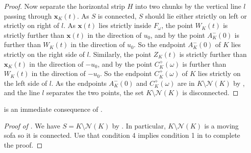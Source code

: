 \begin{proof}
Now separate the horizontal strip \(H\) into two chunks by the vertical line \(l\) passing through \(\mathbf{x}_K(t)\). As \(S\) is connected, \(S\) should lie either strictly on left or strictly on right of \(l\). As \(\mathbf{x}(t)\) lies strictly inside \(F_\omega\), the point \(W_K(t)\) is strictly further than \(\mathbf{x}(t)\) in the direction of \(u_0\), and by  the point \(A_K^-(0)\) is further than \(W_K(t)\) in the direction of \(u_0\). So the endpoint \(A_K^-(0)\) of \(K\) lies strictly on the right side of \(l\). Similarly, the point \(Z_K(t)\) is strictly further than \(\mathbf{x}_K(t)\) in the direction of \(-u_0\), and by  the point \(C_K^+(\omega)\) is further than \(W_K(t)\) in the direction of \(-u_0\). So the endpoint \(C^+_K(\omega)\) of \(K\) lies strictly on the left side of \(l\). As the endpoints \(A^-_K(0)\) and \(C^+_K(\omega)\) are in \(K \setminus \mathcal{N}(K)\) by , and the line \(l\) separates the two points, the set \(K \setminus \mathcal{N}(K)\) is disconnected.
\end{proof}

 is an immediate consequence of .

\begin{proof}[Proof of ]
We have \(S = K \setminus \mathcal{N}(K)\) by . In particular, \(K \setminus \mathcal{N}(K)\) is a moving sofa so it is connected. Use that condition 4 implies condition 1 in  to complete the proof.
\end{proof}